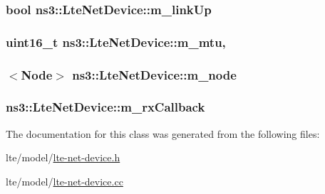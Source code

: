 \subsubsection[{\texorpdfstring{m\+\_\+link\+Up}{m_linkUp}}]{\setlength{\rightskip}{0pt plus 5cm}bool ns3\+::\+Lte\+Net\+Device\+::m\+\_\+link\+Up\hspace{0.3cm}{\ttfamily [private]}}\hypertarget{classns3_1_1LteNetDevice_af857bd796d39770eab5aeab2c2b652c4}{}\label{classns3_1_1LteNetDevice_af857bd796d39770eab5aeab2c2b652c4}
\subsubsection[{\texorpdfstring{m\+\_\+mtu}{m_mtu}}]{\setlength{\rightskip}{0pt plus 5cm}uint16\+\_\+t ns3\+::\+Lte\+Net\+Device\+::m\+\_\+mtu\hspace{0.3cm}{\ttfamily [mutable]}, {\ttfamily [private]}}\hypertarget{classns3_1_1LteNetDevice_ac76e5ec15eb4f50e75d213240f2726ab}{}\label{classns3_1_1LteNetDevice_ac76e5ec15eb4f50e75d213240f2726ab}
\subsubsection[{\texorpdfstring{m\+\_\+node}{m_node}}]{$<${\bf Node}$>$ ns3\+::\+Lte\+Net\+Device\+::m\+\_\+node\hspace{0.3cm}{\ttfamily [private]}}\hypertarget{classns3_1_1LteNetDevice_adf5d0294ef3d72ac69cee152417696a3}{}\label{classns3_1_1LteNetDevice_adf5d0294ef3d72ac69cee152417696a3}
\subsubsection[{\texorpdfstring{m\+\_\+rx\+Callback}{m_rxCallback}}]{ ns3\+::\+Lte\+Net\+Device\+::m\+\_\+rx\+Callback\hspace{0.3cm}{\ttfamily [protected]}}\hypertarget{classns3_1_1LteNetDevice_a6ce4fb791c9763abdfe4bd5c594e93a3}{}\label{classns3_1_1LteNetDevice_a6ce4fb791c9763abdfe4bd5c594e93a3}


The documentation for this class was generated from the following files\+:\begin{DoxyCompactItemize}
\item 
lte/model/\hyperlink{lte-net-device_8h}{lte-\/net-\/device.\+h}\item 
lte/model/\hyperlink{lte-net-device_8cc}{lte-\/net-\/device.\+cc}\end{DoxyCompactItemize}
